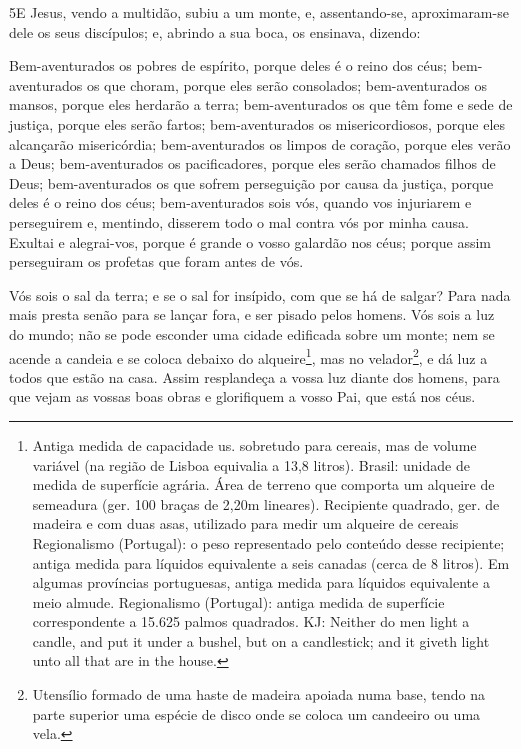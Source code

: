 \medskip

\lettrine{5} E Jesus, vendo a multidão, subiu a um monte, e,
assentando-se, aproximaram-se dele os seus discípulos; e,
abrindo a sua boca, os ensinava, dizendo:

Bem-aventurados os pobres de espírito, porque deles é o reino dos
céus; bem-aventurados os que choram, porque eles serão
consolados; bem-aventurados os mansos, porque eles herdarão a
terra; bem-aventurados os que têm fome e sede de justiça, porque
eles serão fartos; bem-aventurados os misericordiosos, porque
eles alcançarão misericórdia; bem-aventurados os limpos de
coração, porque eles verão a Deus; bem-aventurados os
pacificadores, porque eles serão chamados filhos de Deus;
bem-aventurados os que sofrem perseguição por causa da
justiça, porque deles é o reino dos céus; bem-aventurados
sois vós, quando vos injuriarem e perseguirem e, mentindo, disserem
todo o mal contra vós por minha causa. Exultai e alegrai-vos,
porque é grande o vosso galardão nos céus; porque assim perseguiram
os profetas que foram antes de vós.

Vós sois o sal da terra; e se o sal for insípido, com que se há
de salgar? Para nada mais presta senão para se lançar fora, e ser
pisado pelos homens. Vós sois a luz do mundo; não se pode
esconder uma cidade edificada sobre um monte; nem se acende a
candeia e se coloca debaixo do alqueire\footnote{Antiga medida de
capacidade us. sobretudo para cereais, mas de volume variável (na
região de Lisboa equivalia a 13,8 litros). Brasil: unidade de medida
de superfície agrária. Área de terreno que comporta um alqueire de
semeadura (ger. 100 braças de 2,20m lineares). Recipiente quadrado,
ger. de madeira e com duas asas, utilizado para medir um alqueire de
cereais Regionalismo (Portugal): o peso representado pelo conteúdo
desse recipiente; antiga medida para líquidos equivalente a seis
canadas (cerca de 8 litros). Em algumas províncias portuguesas,
antiga medida para líquidos equivalente a meio almude. Regionalismo
(Portugal): antiga medida de superfície correspondente a 15.625
palmos quadrados.  KJ: Neither do men light a candle, and put it
under a bushel, but on a candlestick; and it giveth light unto all
that are in the house.}, mas no velador\footnote{Utensílio formado
de uma haste de madeira apoiada numa base, tendo na parte superior
uma espécie de disco onde se coloca um candeeiro ou uma vela.}, e dá
luz a todos que estão na casa. Assim resplandeça a vossa luz
diante dos homens, para que vejam as vossas boas obras e glorifiquem
a vosso Pai, que está nos céus.

